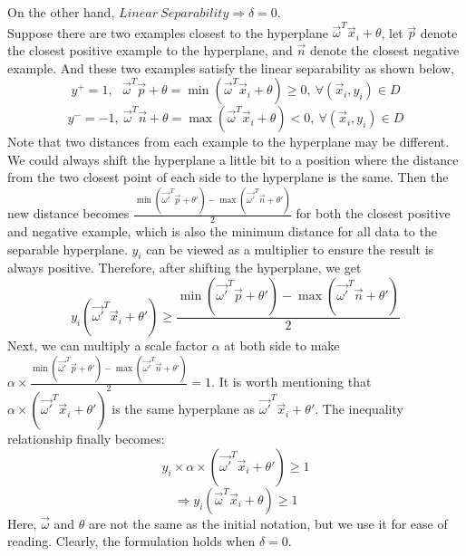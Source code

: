 \begin{enumerate}
\begin{enumerate}
	\medskip
	On the other hand, $Linear\>Separability \Rightarrow \delta = 0$. \\
	Suppose there are two examples closest to the hyperplane $\vec{\omega}^T\vec{x}_i + \theta$, let $\vec{p}$ denote the closest positive example to the hyperplane, and $\vec{n}$ denote the closest negative example. And these two examples satisfy the linear separability as shown below,
	\begin{equation*}
	y^+ = 1, \>\>\>\vec{\omega}^T\vec{p}+ \theta =  \min(\vec{\omega}^T\vec{x}_i + \theta) \geq 0, \>\forall(\vec{x}_i,y_i)\in D
	\end{equation*}
	\begin{equation*}
	y^- = -1, \>\vec{\omega}^T\vec{n}+ \theta = \max(\vec{\omega}^T\vec{x}_i + \theta) < 0, \>\forall(\vec{x}_i,y_i)\in D
	\end{equation*}
	Note that two distances from each example to the hyperplane may be different. We could always shift the hyperplane a little bit to a position where the distance from the two closest point of each side to the hyperplane is the same. Then the new distance becomes $\frac{\min(\vec{\omega'}^T\vec{p} + \theta') - \max(\vec{\omega'}^T\vec{n} + \theta')}{2}$ for both the closest positive and negative example, which is also the minimum distance for all data to the separable hyperplane. $y_i$ can be viewed as a multiplier to ensure the result is always positive. Therefore, after shifting the hyperplane, we get
	\begin{equation*}
	y_i(\vec{\omega'}^T\vec{x}_i + \theta') \geq \frac{\min(\vec{\omega'}^T\vec{p} + \theta') - \max(\vec{\omega'}^T\vec{n} + \theta')}{2}
	\end{equation*} 
	Next, we can multiply a scale factor $\alpha$ at both side to make $\alpha \times \frac{\min(\vec{\omega'}^T\vec{p} + \theta') - \max(\vec{\omega'}^T\vec{n} + \theta')}{2} = 1$. It is worth mentioning that $\alpha \times (\vec{\omega'}^T\vec{x}_i + \theta')$ is the same hyperplane as $\vec{\omega'}^T\vec{x}_i + \theta'$. The inequality relationship finally becomes:
	\begin{equation*}
	y_i\times \alpha \times(\vec{\omega'}^T\vec{x}_i + \theta') \geq 1
	\end{equation*}
	\begin{equation*}
	\Rightarrow y_i(\vec{\omega}^T\vec{x}_i + \theta) \geq 1
	\end{equation*}
	Here, $\vec{\omega}$ and $\theta$ are not the same as the initial notation, but we use it for ease of reading. Clearly, the formulation holds when $\delta = 0$. 
	

\end{enumerate}
\end{enumerate}

